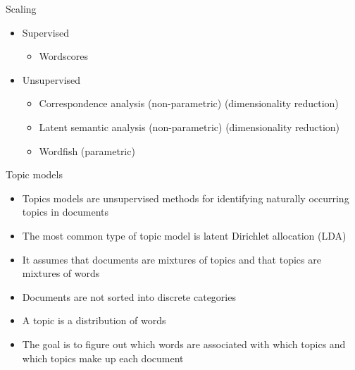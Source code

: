 \documentclass[pdf, 9pt, fleqn, handout]{beamer}
\begin{document}
\begin{frame}{Scaling}
\begin{itemize}
\item Supervised \\[0.5em]
\begin{itemize}
\item Wordscores \\[3em]
\end{itemize}
\item Unsupervised \\[0.5em]
\begin{itemize}
\item Correspondence analysis (non-parametric) (dimensionality reduction) \\[1em]
\item Latent semantic analysis (non-parametric) (dimensionality reduction) \\[1em]
\item Wordfish (parametric)
\end{itemize}
\end{itemize}
\end{frame}

\begin{frame}{Topic models}
\begin{itemize}
\item Topics models are unsupervised methods for identifying naturally occurring topics in documents \\[1em]
\item The most common type of topic model is latent Dirichlet allocation (LDA) \\[1em]
\item It assumes that documents are mixtures of topics and that topics are mixtures of words \\[1em]
\item Documents are not sorted into discrete categories \\[1em]
\item A topic is a distribution of words \\[1em]
\item The goal is to figure out which words are associated with which topics and which topics make up each document
\end{itemize}
\end{frame}
\end{document}
